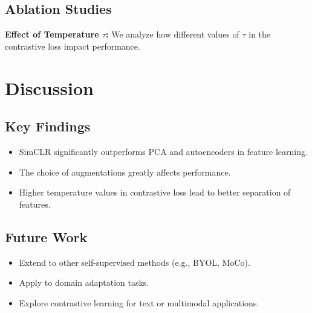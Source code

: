 \documentclass[11pt]{article}
\begin{document}
\subsection{Ablation Studies}
\textbf{Effect of Temperature $\tau$:} We analyze how different values of $\tau$ in the contrastive loss impact performance.

\section{Discussion}

\subsection{Key Findings}
\begin{itemize}
  \item SimCLR significantly outperforms PCA and autoencoders in feature learning.
  \item The choice of augmentations greatly affects performance.
  \item Higher temperature values in contrastive loss lead to better separation of features.
\end{itemize}

\subsection{Future Work}
\begin{itemize}
  \item Extend to other self-supervised methods (e.g., BYOL, MoCo).
  \item Apply to domain adaptation tasks.
  \item Explore contrastive learning for text or multimodal applications.
\end{itemize}
\end{document}
